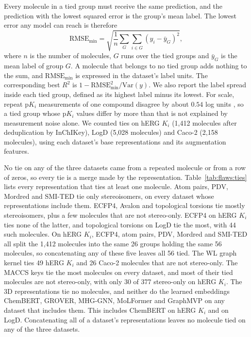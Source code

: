 Every molecule in a tied group must receive the same prediction, and the prediction with the lowest squared error is the group's mean label. The lowest error any model can reach is therefore
\begin{equation}
\mathrm{RMSE}_{\min} = \sqrt{\frac{1}{n}\sum_{G}\sum_{i \in G}\left(y_i - \bar{y}_G\right)^2},
\end{equation}
where $n$ is the number of molecules, $G$ runs over the tied groups and $\bar{y}_G$ is the mean label of group $G$. A molecule that belongs to no tied group adds nothing to the sum, and $\mathrm{RMSE}_{\min}$ is expressed in the dataset's label units. The corresponding best $R^2$ is $1 - \mathrm{RMSE}_{\min}^2 / \mathrm{Var}(y)$. We also report the label spread inside each tied group, defined as its highest label minus its lowest. For scale, repeat p$K_i$ measurements of one compound disagree by about $0.54$ log units \citep{Kramer2012}, so a tied group whose p$K_i$ values differ by more than that is not explained by measurement noise alone. We counted ties on hERG $K_i$ (1,412 molecules after deduplication by InChIKey), LogD (5,028 molecules) and Caco-2 (2,158 molecules), using each dataset's base representations and its augmentation features.

No tie on any of the three datasets came from a repeated molecule or from a row of zeros, so every tie is a merge made by the representation. Table~\ref{tab:flaws:ties} lists every representation that ties at least one molecule. Atom pairs, PDV, Mordred and SMI-TED tie only stereoisomers, on every dataset whose representations include them. ECFP4, Avalon and topological torsions tie mostly stereoisomers, plus a few molecules that are not stereo-only. ECFP4 on hERG $K_i$ ties none of the latter, and topological torsions on LogD tie the most, with 44 such molecules. On hERG $K_i$, ECFP4, atom pairs, PDV, Mordred and SMI-TED all split the 1,412 molecules into the same 26 groups holding the same 56 molecules, so concatenating any of these five leaves all 56 tied. The WL graph kernel ties 49 hERG $K_i$ and 26 Caco-2 molecules that are not stereo-only. The MACCS keys tie the most molecules on every dataset, and most of their tied molecules are not stereo-only, with only 30 of 377 stereo-only on hERG $K_i$. The 3D representations tie no molecules, and neither do the learned embeddings ChemBERT, GROVER, MHG-GNN, MoLFormer and GraphMVP on any dataset that includes them. %
This includes ChemBERT on hERG $K_i$ and on LogD. Concatenating all of a dataset's representations leaves no molecule tied on any of the three datasets.

